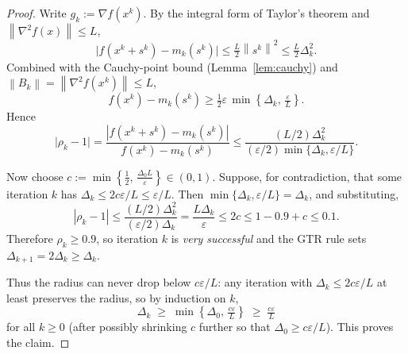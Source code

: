 \documentclass[11pt,a4paper]{report}
\theoremstyle{plain}
\theoremstyle{definition}
\newcommand{\norm}[1]{\left\lVert#1\right\rVert}
\newcommand{\grad}{\nabla}
\newcommand{\eps}{\varepsilon}
\begin{document}
\begin{proof}
Write $g_{k}:=\grad f(x^{k})$. By the integral form of Taylor's theorem and $\norm{\grad^{2}f(x)}\le L$,
\[
  \bigl|f(x^{k}+s^{k})-m_{k}(s^{k})\bigr| \le \tfrac{L}{2}\norm{s^{k}}^{2} \le \tfrac{L}{2}\Delta_{k}^{2}.
\]
Combined with the Cauchy-point bound (Lemma~\ref{lem:cauchy}) and $\norm{B_{k}}=\norm{\grad^{2}f(x^{k})}\le L$,
\[
  f(x^{k})-m_{k}(s^{k}) \ge \tfrac{1}{2}\eps\, \min\left\{\Delta_{k},\,\tfrac{\eps}{L}\right\}.
\]
Hence
\[
  \bigl|\rho_{k}-1\bigr| = \frac{|f(x^k + s^k) - m_k(s^k)|}{f(x^k) - m_k(s^k)} \le \frac{(L/2)\Delta_{k}^{2}}{(\eps/2) \min\{\Delta_{k},\eps/L\}}.
\]

Now choose $c := \min\left\{\tfrac{1}{2},\,\tfrac{\Delta_{0}L}{\eps}\right\}\in(0,1)$. Suppose, for contradiction, that some iteration $k$ has $\Delta_{k}\le 2c\eps/L\le\eps/L$. Then $\min\{\Delta_{k},\eps/L\}=\Delta_{k}$, and substituting,
\[
|\rho_{k}-1| \le \frac{(L/2)\Delta_{k}^{2}}{(\eps/2)\Delta_{k}} = \frac{L\Delta_{k}}{\eps} \le 2c \le 1 - 0.9 + c \le 0.1.
\]
Therefore $\rho_{k}\ge 0.9$, so iteration $k$ is \emph{very successful} and the GTR rule sets $\Delta_{k+1}=2\Delta_{k}\ge\Delta_{k}$.

Thus the radius can never drop below $c\eps/L$: any iteration with
$\Delta_{k}\le 2c\eps/L$ at least preserves the radius, so by induction on $k$,
\[
\Delta_{k}\;\ge\;\min\!\left\{\Delta_{0},\,\tfrac{c\eps}{L}\right\}
            \;\ge\;\tfrac{c\eps}{L}
\]
for all $k\ge 0$ (after possibly shrinking $c$ further so that
$\Delta_{0}\ge c\eps/L$). This proves the claim.
\end{proof}
  
\end{document}
